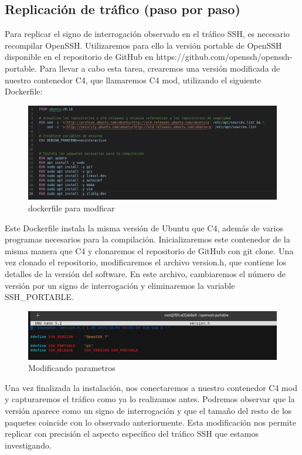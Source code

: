 \documentclass[letter,12pt]{article}
\begin{document}
\subsection{Replicación de tráfico (paso por paso)}
Para replicar el signo de interrogación observado en el tráfico SSH, es necesario recompilar OpenSSH. Utilizaremos para ello la versión portable de OpenSSH disponible en el repositorio de GitHub en https://github.com/openssh/openssh-portable. Para llevar a cabo esta tarea, crearemos una versión modificada de nuestro contenedor C4, que llamaremos C4 mod, utilizando el siguiente Dockerfile:
\begin{figure}[H]
        \centering
        \includegraphics[width=1\textwidth]{img/docker_c4_mod.png}  
        \caption{dockerfile para modficar}
    \end{figure}
Este Dockerfile instala la misma versión de Ubuntu que C4, además de varios programas necesarios para la compilación. Inicializaremos este contenedor de la misma manera que C4 y clonaremos el repositorio de GitHub con git clone. Una vez clonado el repositorio, modificaremos el archivo version.h, que contiene los detalles de la versión del software. En este archivo, cambiaremos el número de versión por un signo de interrogación y eliminaremos la variable SSH\_PORTABLE.
\begin{figure}[H]
        \centering
        \includegraphics[width=1\textwidth]{img/nano_c4_new.png}  
        \caption{Modificando parametros}
    \end{figure}
Una vez finalizada la instalación, nos conectaremos a nuestro contenedor C4 mod y capturaremos el tráfico como ya lo realizamos antes. Podremos observar que la versión aparece como un signo de interrogación y que el tamaño del resto de los paquetes coincide con lo observado anteriormente. Esta modificación nos permite replicar con precisión el aspecto específico del tráfico SSH que estamos investigando.
\end{document}
